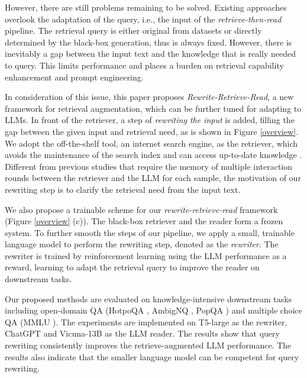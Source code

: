 However, there are still problems remaining to be solved.
Existing approaches overlook the adaptation of the query, i.e., the input of the \textit{retrieve-then-read} pipeline. 
The retrieval query is either original from datasets or directly determined by the black-box generation, thus is always fixed. 
However, there is inevitably a gap between the input text and the knowledge that is really needed to query.
This limits performance and places a burden on retrieval capability enhancement and prompt engineering.

In consideration of this issue, this paper proposes \textit{Rewrite-Retrieve-Read}, a new framework for retrieval augmentation, which can be further tuned for adapting to LLMs.
In front of the retriever, a step of \textit{rewriting the input} is added, filling the gap between the given input and retrieval need, as is shown in Figure \ref{overview}.
We adopt the off-the-shelf tool, an internet search engine, as the retriever, which avoids the maintenance of the search index and can access up-to-date knowledge \cite{lazaridou2022internet}.
Different from previous studies \cite{khattab2022dsp, yao2023react} that require the memory of multiple interaction rounds between the retriever and the LLM for each sample,   
the motivation of our rewriting step is to clarify the retrieval need from the input text. 

We also propose a trainable scheme for our \textit{rewrite-retrieve-read} framework (Figure \ref{overview} (c)).
The black-box retriever and the reader form a frozen system.
To further smooth the steps of our pipeline,
we apply a small, trainable language model to perform the rewriting step, denoted as the \textit{rewriter}.
The rewriter is trained by reinforcement learning using the LLM performance as a reward, learning to adapt the retrieval query to improve the reader on downstream tasks. 

Our proposed methods are evaluated on knowledge-intensive downstream tasks including open-domain QA (HotpoQA \cite{yang-etal-2018-hotpotqa}, AmbigNQ \cite{min2020ambigqa}, PopQA \cite{mallen2023llm_memorization}) and multiple choice QA (MMLU \cite{hendryckstest2021mmlu}). 
The experiments are implemented on T5-large \cite{2020t5} as the rewriter, ChatGPT \cite{ouyang2022training} and Vicuna-13B \cite{vicuna2023} as the LLM reader. 
The results show that query rewriting consistently improves the retrieve-augmented LLM performance. 
The results also indicate that the smaller language model can be competent for query rewriting.

